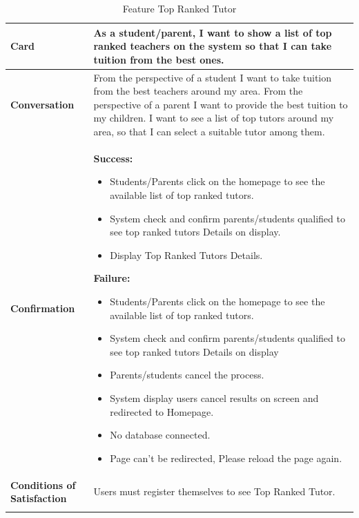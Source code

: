 \begin{center}
\setlength{\tabcolsep}{0.8cm}
\renewcommand{\arraystretch}{1.2}
        \centering
        \begin{longtable}{|m{70pt}|p{9cm}|}
            \hline
                \textbf{Card} &
                    As a student/parent, I want to show a list of top ranked teachers on the system so that I can take tuition from the best ones.\\
            \hline
                \textbf{Conversation} &
                     From the perspective of a student I want to take tuition from the best teachers around my area. From the perspective of a parent I want to provide the best tuition to my children. I want to see a list of top tutors around my area, so that I can select a suitable tutor among them.\\
            \hline
                \textbf{Confirmation} &
                     \textbf{ Success:}
                        \begin{itemize}
                            \item Students/Parents click on the homepage to see the available list of top ranked tutors.
                            \item System check and confirm parents/students qualified to see top ranked tutors Details on display.
                            \item Display Top Ranked Tutors Details.
                        \end{itemize}
                    \textbf{Failure:}
                        \begin{itemize}
                            \item  Students/Parents click on the homepage to see the available list of top ranked tutors.
                            \item System check and confirm parents/students qualified to see top ranked tutors Details on display
                            \item Parents/students cancel the process.
                            \item System display users cancel results on screen and redirected to Homepage.
                            \item No database connected.
                            \item Page can't be redirected, Please reload the page again.
                        \end{itemize}\\
            \hline
                \textbf{Conditions of Satisfaction} &  
                    Users must register themselves to see Top Ranked Tutor.\\
            \hline
        \caption{Feature Top Ranked Tutor}
        \label{tab:my_label}
        \end{longtable}
\end{center}



